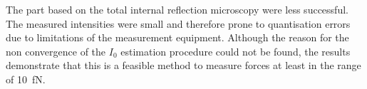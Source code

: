 \documentclass[
    twoside=false,
    twocolumn=true,
    fontsize=11pt,
]{scrarticle}
\begin{document}
The part based on the total internal reflection microscopy were less successful.
The measured intensities were small and therefore prone to quantisation errors due to limitations of the measurement equipment.
Although the reason for the non convergence of the $I_0$ estimation procedure could not be found, the results demonstrate that this is a feasible method to measure forces at least in the range of \SI{10}{\femto N}.

{}
\nocite{*}
\printbibliography
\end{document}
